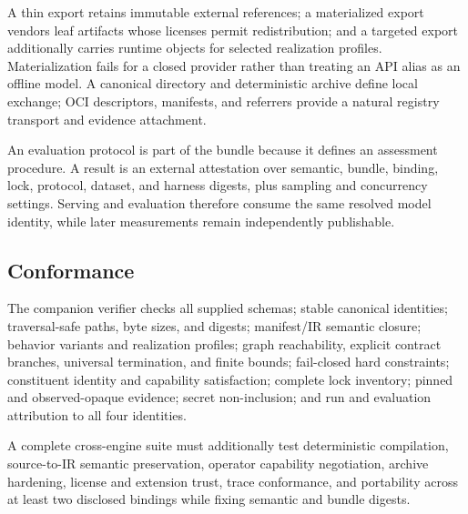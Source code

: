 A thin export retains immutable external references; a materialized export
vendors leaf artifacts whose licenses permit redistribution; and a targeted
export additionally carries runtime objects for selected realization
profiles. Materialization fails for a closed provider rather than treating an
API alias as an offline model. A canonical directory and deterministic archive
define local exchange; OCI descriptors, manifests, and referrers provide a
natural registry transport and evidence attachment.

An evaluation protocol is part of the bundle because it defines an assessment
procedure. A result is an external attestation over semantic, bundle, binding,
lock, protocol, dataset, and harness digests, plus sampling and concurrency
settings. Serving and evaluation therefore consume the same resolved model
identity, while later measurements remain independently publishable.

\subsection{Conformance}

The companion verifier checks all supplied schemas; stable canonical
identities; traversal-safe paths, byte sizes, and digests; manifest/IR semantic
closure; behavior variants and realization profiles; graph reachability,
explicit contract branches, universal termination, and finite bounds; fail-closed hard
constraints; constituent identity and capability satisfaction; complete lock
inventory; pinned and observed-opaque evidence; secret non-inclusion; and run
and evaluation attribution to all four identities.

A complete cross-engine suite must additionally test deterministic compilation,
source-to-IR semantic preservation, operator capability negotiation, archive
hardening, license and extension trust, trace conformance, and portability
across at least two disclosed bindings while fixing semantic and bundle
digests.
\endgroup
